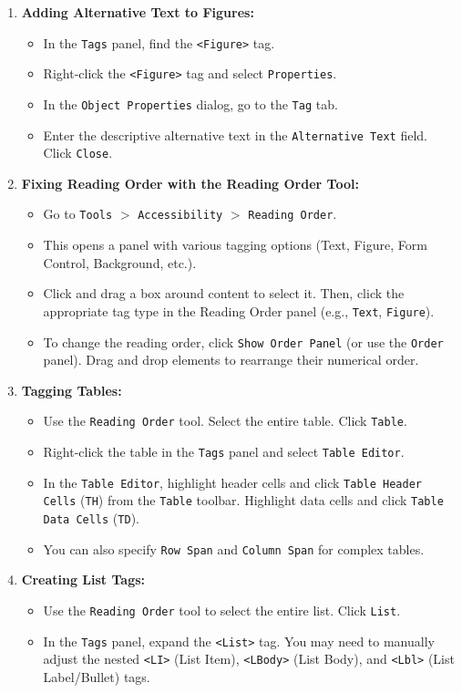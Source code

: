 \begin{enumerate}
\item \textbf{Adding Alternative Text to Figures:}
    \begin{itemize}
    \item In the \texttt{Tags} panel, find the \texttt{<Figure>} tag.
    \item Right-click the \texttt{<Figure>} tag and select \texttt{Properties}.
    \item In the \texttt{Object Properties} dialog, go to the \texttt{Tag} tab.
    \item Enter the descriptive alternative text in the \texttt{Alternative Text} field. Click \texttt{Close}.
    \end{itemize}

\item \textbf{Fixing Reading Order with the Reading Order Tool:}
    \begin{itemize}
    \item Go to \texttt{Tools} $>$ \texttt{Accessibility} $>$ \texttt{Reading Order}.
    \item This opens a panel with various tagging options (Text, Figure, Form Control, Background, etc.).
    \item Click and drag a box around content to select it. Then, click the appropriate tag type in the Reading Order panel (e.g., \texttt{Text}, \texttt{Figure}).
    \item To change the reading order, click \texttt{Show Order Panel} (or use the \texttt{Order} panel). Drag and drop elements to rearrange their numerical order.
    \end{itemize}

\item \textbf{Tagging Tables:}
    \begin{itemize}
    \item Use the \texttt{Reading Order} tool. Select the entire table. Click \texttt{Table}.
    \item Right-click the table in the \texttt{Tags} panel and select \texttt{Table Editor}.
    \item In the \texttt{Table Editor}, highlight header cells and click \texttt{Table Header Cells} (\texttt{TH}) from the \texttt{Table} toolbar. Highlight data cells and click \texttt{Table Data Cells} (\texttt{TD}).
    \item You can also specify \texttt{Row Span} and \texttt{Column Span} for complex tables.
    \end{itemize}

\item \textbf{Creating List Tags:}
    \begin{itemize}
    \item Use the \texttt{Reading Order} tool to select the entire list. Click \texttt{List}.
    \item In the \texttt{Tags} panel, expand the \texttt{<List>} tag. You may need to manually adjust the nested \texttt{<LI>} (List Item), \texttt{<LBody>} (List Body), and \texttt{<Lbl>} (List Label/Bullet) tags.
    \end{itemize}
\end{enumerate}

